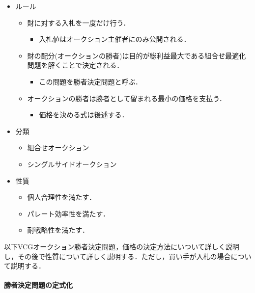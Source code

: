 \begin{itemize}
\tightlist
\item
  ルール

  \begin{itemize}
  \tightlist
  \item
    財に対する入札を一度だけ行う．

    \begin{itemize}
    \tightlist
    \item
      入札値はオークション主催者にのみ公開される．
    \end{itemize}
  \item
    財の配分(オークションの勝者)は目的が総利益最大である組合せ最適化問題を解くことで決定される．

    \begin{itemize}
    \tightlist
    \item
      この問題を勝者決定問題と呼ぶ．
    \end{itemize}
  \item
    オークションの勝者は勝者として留まれる最小の価格を支払う．

    \begin{itemize}
    \tightlist
    \item
      価格を決める式は後述する．
    \end{itemize}
  \end{itemize}
\item
  分類

  \begin{itemize}
  \tightlist
  \item
    組合せオークション
  \item
    シングルサイドオークション
  \end{itemize}
\item
  性質

  \begin{itemize}
  \tightlist
  \item
    個人合理性を満たす．
  \item
    パレート効率性を満たす．
  \item
    耐戦略性を満たす．
  \end{itemize}
\end{itemize}

以下VCGオークション勝者決定問題，価格の決定方法にいついて詳しく説明し，その後で性質について詳しく説明する．ただし，買い手が入札の場合について説明する．

\hypertarget{ux52ddux8005ux6c7aux5b9aux554fux984cux306eux5b9aux5f0fux5316}{%
\paragraph{勝者決定問題の定式化}\label{ux52ddux8005ux6c7aux5b9aux554fux984cux306eux5b9aux5f0fux5316}}

